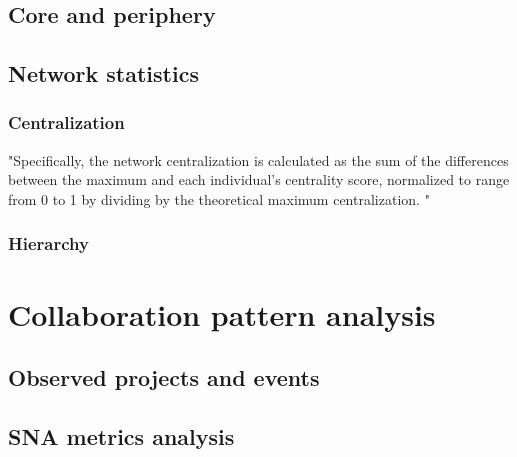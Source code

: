 
\subsection{Core and periphery}

\subsection{Network statistics}
\subsubsection{Centralization}
"Specifically, the network centralization is calculated as the sum of the differences between the maximum and each individual's centrality score, normalized to range from 0 to 1 by dividing by the theoretical maximum centralization.   \cite{crowstonHierarchyCentralizationFree2006}"

\cite{klugUnderstandingGroupDynamics}

\subsubsection{Hierarchy}

\section{Collaboration pattern analysis}
\subsection{Observed projects and events}
\subsection{SNA metrics analysis}

